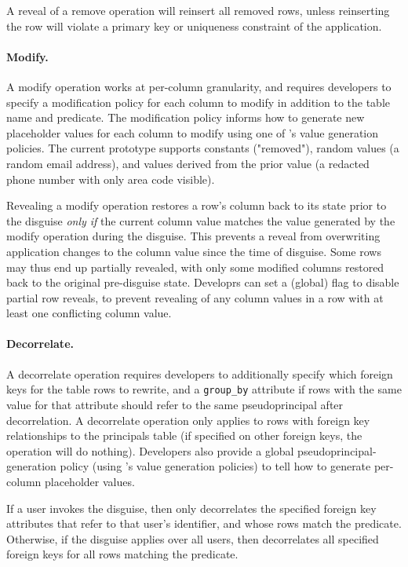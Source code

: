 %
A reveal of a remove operation will reinsert all removed rows, unless
reinserting the row will violate a primary key or uniqueness constraint of the
application.
%

%
\paragraph{Modify.}
A modify operation works at per-column granularity, and requires developers to
specify a modification policy for each column to modify in addition to the table
name and predicate.
%
The modification policy informs \sys how to generate new placeholder values for
each column to modify using one of \sys's value generation policies. The current
prototype supports constants (\eg "removed"), random values (\eg a random email
address), and values derived from the prior value (\eg a redacted phone number
with only area code visible).
%

%
Revealing a modify operation restores a row's column back to its state prior
to the disguise \emph{only if} the current column value matches the value
generated by the modify operation during the disguise. This prevents a reveal
from overwriting application changes to the column value since the time of
disguise.
%
Some rows may thus end up partially revealed, with only some modified columns
restored back to the original pre-disguise state.  Developrs can set a (global)
flag to disable partial row reveals, to prevent revealing of any column values
in a row with at least one conflicting column value.
%

%
\paragraph{Decorrelate.}
%
A decorrelate operation requires developers to additionally specify \one{} which
foreign keys for the table rows to rewrite, and \two{} a
\texttt{group\_by} attribute if rows with the same value for that attribute
should refer to the same pseudoprincipal after decorrelation.
%
A decorrelate operation only applies to rows with foreign key relationships to
the principals table (if specified on other foreign keys, the operation will do
nothing).
%
Developers also provide a global pseudoprincipal-generation policy
(using \sys's value generation policies) to tell \sys how to generate per-column
placeholder values.
%

%
If a user invokes the disguise, then \sys only decorrelates the specified
foreign key attributes that refer to that user's identifier, and whose
rows match the predicate. 
%
Otherwise, if the disguise applies over all users, then \sys decorrelates all
specified foreign keys for all rows matching the predicate.
%

